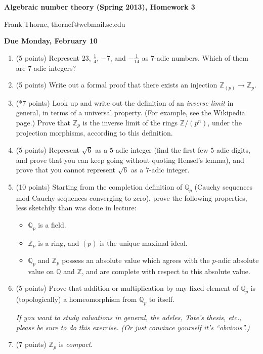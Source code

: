\documentclass[12pt]{article}
\newcommand{\Q}{\mathbb{Q}}
\newcommand{\Z}{\mathbb{Z}}
\begin{document}
\setlength{\topmargin}{-2mm}





\begin{center}{\bf Algebraic number theory (Spring 2013), Homework 3}
\end{center}
\begin{center}Frank Thorne, thornef@webmail.sc.edu
\end{center}
\begin{center}
{\bf Due Monday, February 10}
\end{center}

\begin{enumerate}
\item (5 points)
Represent $23$, $\frac{1}{4}$, $-7$, and $-\frac{1}{14}$ as $7$-adic numbers. Which of them
are $7$-adic integers?

\item (5 points)
Write out a formal proof that there exists an injection $\Z_{(p)} \rightarrow \Z_p$.

\skull

\item (*7 points)
Look up and write out the definition of an {\itshape inverse limit} in general,
in terms of a universal property. (For example, see the Wikipedia page.) Prove that $\Z_p$
is the inverse limit of the rings $\Z/(p^n)$, under the projection morphisms, according
to this definition.

\item (5 points) Represent $\sqrt{6}$ as a $5$-adic integer (find the first few $5$-adic
digits, and prove that you can keep going without quoting Hensel's lemma), and prove that
you cannot represent $\sqrt{6}$ as a $7$-adic integer.

\item (10 points) Starting from the completion definition of $\Q_p$ (Cauchy sequences mod 
Cauchy sequences converging to zero), prove the following properties, less sketchily than was done
in lecture:
\begin{itemize}
\item $\Q_p$ is a field.
\item $\Z_p$ is a ring, and $(p)$ is the unique maximal ideal.
\item $\Q_p$ and $\Z_p$ possess an absolute value which agrees with the $p$-adic absolute value
on $\Q$ and $\Z$, and are complete with respect to this absolute value.
\end{itemize}

\item (5 points)
Prove that addition or multiplication by any fixed element of $\Q_p$ is (topologically) a homeomorphism from $\Q_p$
to itself.

{\itshape If you want to study valuations in general, the adeles, Tate's thesis, etc., please be sure to
do this exercise. (Or just convince yourself it's ``obvious''.)}

\item (7 points)
$\Z_p$ is {\itshape compact}.

\end{enumerate}
\end{document}
